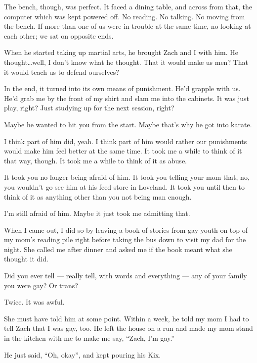 The bench, though, was perfect. It faced a dining table, and across from that, the computer which was kept powered off. No reading. No talking. No moving from the bench. If more than one of us were in trouble at the same time, no looking at each other; we sat on opposite ends.

When he started taking up martial arts, he brought Zach and I with him. He thought\ldots{}well, I don't know what he thought. That it would make us men? That it would teach us to defend ourselves?

In the end, it turned into its own means of punishment. He'd grapple with us. He'd grab me by the front of my shirt and slam me into the cabinets. It was just play, right? Just studying up for the next session, right?

\begin{ally}
Maybe he wanted to hit you from the start. Maybe that's why he got into karate.
\end{ally}
I think part of him did, yeah. I think part of him would rather our punishments would make him feel better at the same time. It took me a while to think of it that way, though. It took me a while to think of it as abuse.

\begin{ally}
It took you no longer being afraid of him. It took you telling your mom that, no, you wouldn't go see him at his feed store in Loveland. It took you until then to think of it as anything other than you not being man enough.
\end{ally}
I'm still afraid of him. Maybe it just took me admitting that.
\newpage

When I came out, I did so by leaving a book of stories from gay youth on top of my mom's reading pile right before taking the bus down to visit my dad for the night. She called me after dinner and asked me if the book meant what she thought it did.

\begin{ally}
Did you ever tell --- really tell, with words and everything --- any of your family you were gay? Or trans?
\end{ally}
Twice. It was awful.

She must have told him at some point. Within a week, he told my mom I had to tell Zach that I was gay, too. He left the house on a run and made my mom stand in the kitchen with me to make me say, ``Zach, I'm gay.''

He just said, ``Oh, okay'', and kept pouring his Kix.

